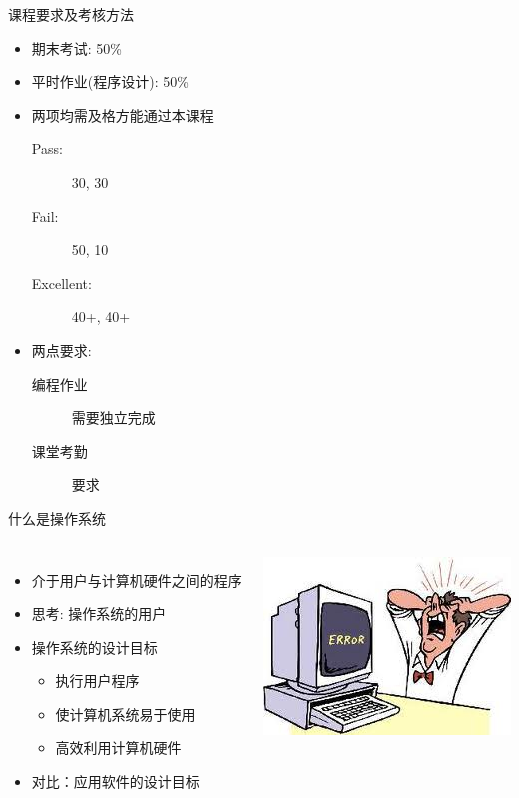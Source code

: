 \documentclass[xcolor=svgnames]{beamer}
\begin{document}
\begin{CJK*}{UTF8}{gbsn}
\begin{frame}{课程要求及考核方法}
\begin{itemize}
\item 期末考试: 50\%
\item 平时作业(程序设计): 50\%
\item 两项均需及格方能通过本课程
\begin{description}
\item[Pass:] 30, 30
\item[Fail:] 50, 10
\item[Excellent:] 40+, 40+
\end{description}
\item 两点要求:
\begin{description}
\item[编程作业] 需要独立完成
\item[课堂考勤]要求 
\end{description}
\end{itemize}
\end{frame}

\begin{frame}{什么是操作系统}
\begin{columns}%
\begin{itemize}
\item 介于\alert{用户}与计算机硬件之间的程序 
\item 思考: 操作系统的用户
\item 操作系统的设计目标
\begin{itemize}
\item 执行用户程序
\item 使计算机系统易于使用
\item 高效利用计算机硬件
\end{itemize}
\item 对比：应用软件的设计目标
\end{itemize}
\includegraphics[width=.9\textwidth]{frustrated-user.jpeg}
\end{columns}
\end{frame}


\end{CJK*}
\end{document}
